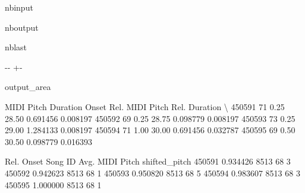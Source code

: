 \documentclass[letterpaper,10pt,english]{sphinxmanual}
\newlength\nbsphinxcodecellspacing
\begin{document}
\begin{sphinxuseclass}{nbinput}
{
\begin{sphinxVerbatim}[commandchars=\\\{\}]
\llap{\color{nbsphinxin}[46]:\,\hspace{\fboxrule}\hspace{\fboxsep}}
\end{sphinxVerbatim}
}

\end{sphinxuseclass}
\begin{sphinxuseclass}{nboutput}
\begin{sphinxuseclass}{nblast}
{

\kern-\sphinxverbatimsmallskipamount\kern-\baselineskip
\kern+\FrameHeightAdjust\kern-\fboxrule
\vspace{\nbsphinxcodecellspacing}

\begin{sphinxuseclass}{output_area}
\begin{sphinxuseclass}{}


\begin{sphinxVerbatim}[commandchars=\\\{\}]
\llap{\color{nbsphinxout}[46]:\,\hspace{\fboxrule}\hspace{\fboxsep}}        MIDI Pitch  Duration  Onset  Rel. MIDI Pitch  Rel. Duration  \textbackslash{}
450591          71      0.25  28.50         0.691456       0.008197
450592          69      0.25  28.75         0.098779       0.008197
450593          73      0.25  29.00         1.284133       0.008197
450594          71      1.00  30.00         0.691456       0.032787
450595          69      0.50  30.50         0.098779       0.016393

        Rel. Onset  Song ID  Avg. MIDI Pitch  shifted\_pitch
450591    0.934426     8513               68              3
450592    0.942623     8513               68              1
450593    0.950820     8513               68              5
450594    0.983607     8513               68              3
450595    1.000000     8513               68              1
\end{sphinxVerbatim}



\end{sphinxuseclass}
\end{sphinxuseclass}
}

\end{sphinxuseclass}
\end{sphinxuseclass}
\end{document}
